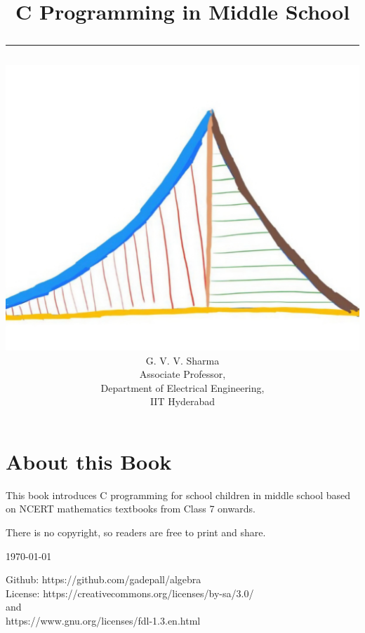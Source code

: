 \documentclass[journal]{IEEEtran}
\begin{document}

\onecolumn


\title{
	\begin{center}
	C Programming in Middle School
	\\
\rule{0.4\columnwidth}{0.4pt}
\end{center}
}
\author{
\vspace{11cm}
	\begin{center}
\includegraphics[width=0.2\columnwidth]{figs/logo.jpg}
\\
		{\huge	G. V. V. Sharma}\\Associate Professor,\\Department of Electrical Engineering, \\ IIT Hyderabad
	\end{center}
}
\maketitle

\newpage
\section*{About this Book}

This book introduces C programming for school children in middle school based on 
 NCERT mathematics textbooks from Class 7 onwards.  

There is no copyright, so readers are free to print and share.  

\begin{flushright}
\today
\end{flushright}
Github: https://github.com/gadepall/algebra
		\\
License: https://creativecommons.org/licenses/by-sa/3.0/
\\
and
\\
https://www.gnu.org/licenses/fdl-1.3.en.html
\end{document}
